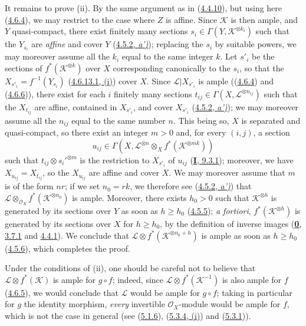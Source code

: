 It remains to prove (ii). By the same argument as in
(\hyperref[II.4.4.10]{4.4.10}), but using here
(\hyperref[II.4.6.4]{4.6.4}), we may restrict to the case where $Z$ is
affine. Since $\mathcal{K}$ is then ample, and $Y$ quasi-compact, there exist
finitely many sections $s_i\in\Gamma(Y,\mathcal{K}^{\otimes k_i})$
such that the $Y_{s_i}$
are \emph{affine} and cover $Y$
(\hyperref[II.4.5.2]{4.5.2, \emph{a')}});
replacing the $s_i$ by suitable powers, we may moreover
assume all the $k_i$ equal to the same integer $k$. Let $s'_i$ be the
sections of $f^*(\mathcal{K}^{\otimes k})$ over $X$ corresponding
canonically to the $s_i$, so that the
$X_{s'_i}=f^{-1}(Y_{s_i})$ (\hyperref[II.4.6.13.1]{4.6.13.1, (i)})
cover $X$. Since $\mathcal{L}|X_{s'_i}$ is ample
((\hyperref[II.4.6.4]{4.6.4}) and
(\hyperref[II.4.6.6]{4.6.6})), there exist for each $i$ finitely many
sections $t_{ij}\in\Gamma(X,\mathcal{L}^{\otimes n_{ij}})$ such that the
$X_{t_{ij}}$ are affine, contained in $X_{s'_i}$, and cover
$X_{s'_i}$ (\hyperref[II.4.5.2]{4.5.2, \emph{a')}}); we may moreover
assume all the $n_{ij}$ equal to the same number $n$. This being so, $X$ is
separated and quasi-compact, so there exist an integer $m>0$ and, for every
$(i,j)$, a section
\[
  u_{ij}\in\Gamma(X,\mathcal{L}^{\otimes n}\otimes_X
  f^*(\mathcal{K}^{\otimes mk}))
\]
such that $t_{ij}\otimes s_i'^{\otimes m}$ is the restriction to $X_{s'_i}$
of $u_{ij}$ (\hyperref[I.9.3.1]{\textbf{I}, 9.3.1}); moreover, we have
$X_{u_{ij}}=X_{t_{ij}}$, so the $X_{u_{ij}}$ are affine and cover
$X$. We may moreover assume that $m$ is of the form $nr$; if we set
$n_0=rk$, we therefore see (\hyperref[II.4.5.2]{4.5.2, \emph{a')}}) that
$\mathcal{L}\otimes_{\mathcal{O}_X}f^*(\mathcal{K}^{\otimes n_0})$ is
ample. Moreover,
there exists $h_0>0$ such that $\mathcal{K}^{\otimes h}$ is generated by its
sections over $Y$ as soon as $h\geq h_0$
(\hyperref[II.4.5.5]{4.5.5}); \emph{a fortiori},
$f^*(\mathcal{K}^{\otimes h})$ is generated by its sections over
$X$ for $h\geq h_0$, by the definition of inverse images
(\hyperref[0.3.7.1]{\textbf{0}, 3.7.1} and
\hyperref[0.4.4.1]{4.4.1}). We conclude that
$\mathcal{L}\otimes f^*(\mathcal{K}^{\otimes n_0+h})$ is ample as soon as
$h\geq h_0$ (\hyperref[II.4.5.6]{4.5.6}), which completes the
proof.

\begin{remark}[4.6.14]
\label{II.4.6.14}
Under the conditions of (ii), one should be careful not to believe that
$\mathcal{L}\otimes f^*(\mathcal{K})$ is ample for $g\circ f$; indeed,
since $\mathcal{L}\otimes f^*(\mathcal{K}^{-1})$ is also ample for $f$
(\hyperref[II.4.6.5]{4.6.5}), we would conclude that $\mathcal{L}$ would be
ample for $g\circ f$; taking in particular for $g$ the identity
morphism, \emph{every} invertible $\mathcal{O}_X$-module would be ample for $f$, which
is not the case in general (see (\hyperref[II.5.1.6]{5.1.6}),
(\hyperref[II.5.3.4]{5.3.4, (i)}) and
(\hyperref[II.5.3.1]{5.3.1})).
\end{remark}

